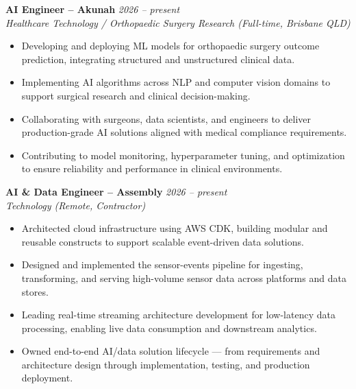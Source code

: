 \textbf{AI Engineer – Akunah} \hfill \textit{2026 – present} \\
\textit{Healthcare Technology / Orthopaedic Surgery Research (Full-time, Brisbane QLD)} \\[-0.6em]
\begin{itemize}[leftmargin=*]
    \item Developing and deploying ML models for orthopaedic surgery outcome prediction, integrating structured and unstructured clinical data.
    \item Implementing AI algorithms across NLP and computer vision domains to support surgical research and clinical decision-making.
    \item Collaborating with surgeons, data scientists, and engineers to deliver production-grade AI solutions aligned with medical compliance requirements.
    \item Contributing to model monitoring, hyperparameter tuning, and optimization to ensure reliability and performance in clinical environments.
\end{itemize}

\vspace{0.1em}

\textbf{AI \& Data Engineer – Assembly} \hfill \textit{2026 – present} \\
\textit{Technology (Remote, Contractor)} \\[-0.6em]
\begin{itemize}[leftmargin=*]
    \item Architected cloud infrastructure using AWS CDK, building modular and reusable constructs to support scalable event-driven data solutions.
    \item Designed and implemented the sensor-events pipeline for ingesting, transforming, and serving high-volume sensor data across platforms and data stores.
    \item Leading real-time streaming architecture development for low-latency data processing, enabling live data consumption and downstream analytics.
    \item Owned end-to-end AI/data solution lifecycle — from requirements and architecture design through implementation, testing, and production deployment.
\end{itemize}

\vspace{0.1em}

